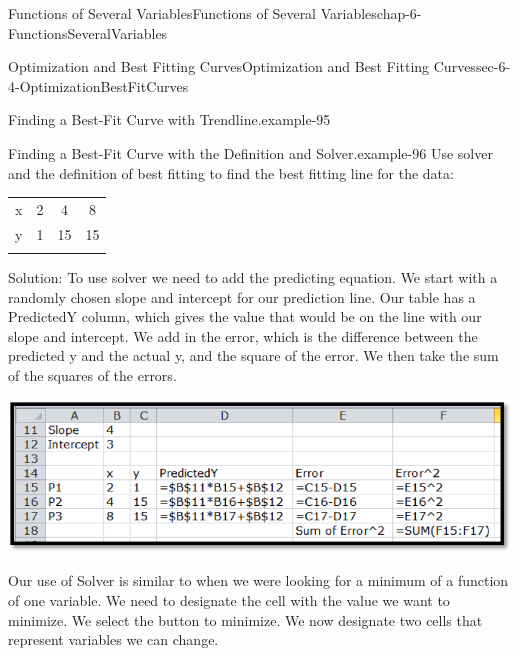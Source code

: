 \documentclass[oneside,10pt,]{book}
\numberwithin{equation}{section}
\newcommand{\hrulethin}  {\noalign{\hrule height 0.04em}}
\newcommand{\hrulethick} {\noalign{\hrule height 0.11em}}
\begin{document}
\begin{chapterptx}{Functions of Several Variables}{}{Functions of Several Variables}{}{}{chap-6-FunctionsSeveralVariables}
\begin{sectionptx}{Optimization and Best Fitting Curves}{}{Optimization and Best Fitting Curves}{}{}{sec-6-4-OptimizationBestFitCurves}
\begin{example}{Finding a Best-Fit Curve with Trendline.}{example-95}
\begin{sidebyside}{1}{0.1}{0.1}{0}
\begin{sbspanel}{0.8}
\end{sbspanel}%
\end{sidebyside}%
\end{example}
\begin{example}{Finding a Best-Fit Curve with the Definition and Solver.}{example-96}%
\hypertarget{p-2446}{}%
Use solver and the definition of best fitting to find the best fitting line for the data:%
\begin{sidebyside}{1}{0}{0}{0}%
\begin{sbspanel}{1}%
{\centering%
\begin{tabular}{cccc}\hrulethick
x&2&4&8\tabularnewline\hrulethin
y&1&15&15\tabularnewline\hrulethin
\end{tabular}
\par}
\end{sbspanel}%
\end{sidebyside}%
\par
\hypertarget{p-2447}{}%
Solution:  To use solver we need to add the predicting equation.  We start with a randomly chosen slope and intercept for our prediction line.  Our table has a PredictedY column, which gives the value that would be on the line with our slope and intercept.  We add in the error, which is the difference between the predicted y and the actual y, and the square of the error.  We then take the sum of the squares of the errors.%
\begin{sidebyside}{1}{0.15}{0.15}{0}%
\begin{sbspanel}{0.7}%
\includegraphics[width=1\linewidth]{images/sec-6-4-3.png}
\end{sbspanel}%
\end{sidebyside}%
\par
\hypertarget{p-2448}{}%
Our use of Solver is similar to when we were looking for a minimum of a function of one variable.  We need to designate the cell with the value we want to minimize.  We select the button to minimize.  We now designate two cells that represent variables we can change.%
\begin{sidebyside}{1}{0.1}{0.1}{0}%
\begin{sbspanel}{0.8}%

\end{sbspanel}
\end{sidebyside}
\end{example}
\end{sectionptx}
\end{chapterptx}
\end{document}
